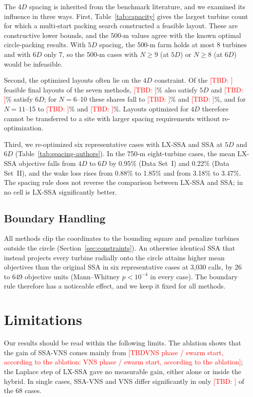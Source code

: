 \documentclass[journal,twoside]{IEEEtran}
\newcommand{\TBD}[1]{\textcolor{red}{[TBD\ifx\relax#1\relax\else: #1\fi]}}
\begin{document}
The $4D$ spacing is inherited from the benchmark literature, and we examined its influence in three ways. First, Table~\ref{tab:capacity} gives the largest turbine count for which a multi-start packing search constructed a feasible layout. These are constructive lower bounds, and the 500-m values agree with the known optimal circle-packing results. With $5D$ spacing, the 500-m farm holds at most 8 turbines and with $6D$ only 7, so the 500-m cases with $N\ge9$ (at $5D$) or $N\ge8$ (at $6D$) would be infeasible.

Second, the optimized layouts often lie on the $4D$ constraint. Of the \TBD{} feasible final layouts of the seven methods, \TBD{}\% also satisfy $5D$ and \TBD{}\% satisfy $6D$; for $N=6$--10 these shares fall to \TBD{}\% and \TBD{}\%, and for $N=11$--15 to \TBD{}\% and \TBD{}\%. Layouts optimized for $4D$ therefore cannot be transferred to a site with larger spacing requirements without re-optimization.

Third, we re-optimized six representative cases with LX-SSA and SSA at $5D$ and $6D$ (Table~\ref{tab:spacing-authors}). In the 750-m eight-turbine cases, the mean LX-SSA objective falls from $4D$ to $6D$ by 0.95\% (Data Set~I) and 0.22\% (Data Set~II), and the wake loss rises from 0.88\% to 1.85\% and from 3.18\% to 3.47\%. The spacing rule does not reverse the comparison between LX-SSA and SSA; in no cell is LX-SSA significantly better.

\subsection{Boundary Handling}
\label{sec:boundary}
All methods clip the coordinates to the bounding square and penalize turbines outside the circle (Section~\ref{sec:constraints}). An otherwise identical SSA that instead projects every turbine radially onto the circle attains higher mean objectives than the original SSA in six representative cases at 3,030 calls, by 26 to 649 objective units (Mann--Whitney $p<10^{-4}$ in every case). The boundary rule therefore has a noticeable effect, and we keep it fixed for all methods.

\section{Limitations}
\label{sec:limits}
Our results should be read within the following limits. The ablation shows that the gain of SSA-VNS comes mainly from \TBD{VNS phase / swarm start, according to the ablation}; the Laplace step of LX-SSA gave no measurable gain, either alone or inside the hybrid. In single cases, SSA-VNS and VNS differ significantly in only \TBD{} of the 68 cases.
\end{document}
